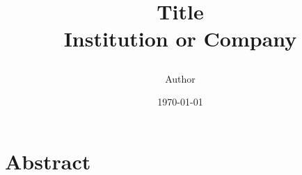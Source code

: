 \documentclass[12pt]{report}
\title{
    
    \hfill \break
    {Title}\\
    {\large Institution or Company}\\
}
\author{Author}
\date{\today}
\begin{document}
    \maketitle
    \chapter{Abstract}
    
    \tableofcontents
	
    \listoftables
    \listoffigures
    
\end{document}
